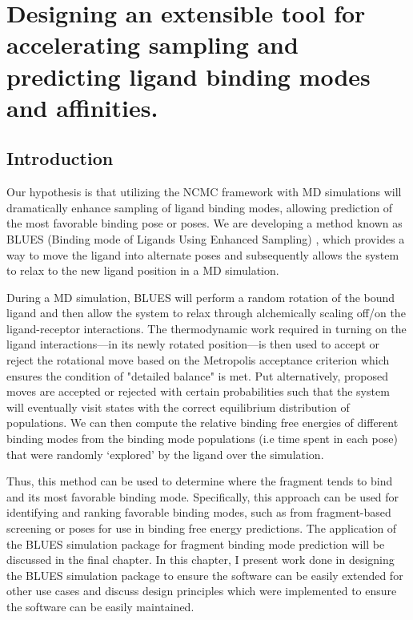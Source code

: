 \chapter{Designing an extensible tool for accelerating sampling and predicting ligand binding modes and affinities.} \label{BLUES}

\section{Introduction}
Our hypothesis is that utilizing the NCMC \cite{Nilmeier08112011} framework with MD simulations will dramatically enhance sampling of ligand binding modes, allowing prediction of the most favorable binding pose or poses.
We are developing a method known as BLUES (Binding mode of Ligands Using Enhanced Sampling) \cite{BLUESpaper}, which provides a way to move the ligand into alternate poses and subsequently allows the system to relax to the new ligand position in a MD simulation.

During a MD simulation, BLUES will perform a random rotation of the bound ligand and then allow the system to relax through alchemically scaling off/on the ligand-receptor interactions.
The thermodynamic work required in turning on the ligand interactions---in its newly rotated position---is then used to accept or reject the rotational move based on the Metropolis acceptance criterion \cite{hastings1970monte} which ensures the condition of "detailed balance" is met.
Put alternatively, proposed moves are accepted or rejected with certain probabilities such that the system will eventually visit states with the correct equilibrium distribution of populations.
We can then compute the relative binding free energies of different binding modes from the binding mode populations (i.e time spent in each pose) that were randomly `explored' by the ligand over the simulation.

Thus, this method can be used to determine where the fragment tends to bind and its most favorable binding mode.
Specifically, this approach can be used for identifying and ranking favorable binding modes, such as from fragment-based screening or poses for use in binding free energy predictions.
The application of the BLUES simulation package for fragment binding mode prediction will be discussed in the final chapter.
In this chapter, I present work done in designing the BLUES simulation package to ensure the software can be easily extended for other use cases and discuss design principles which were implemented to ensure the software can be easily maintained.

